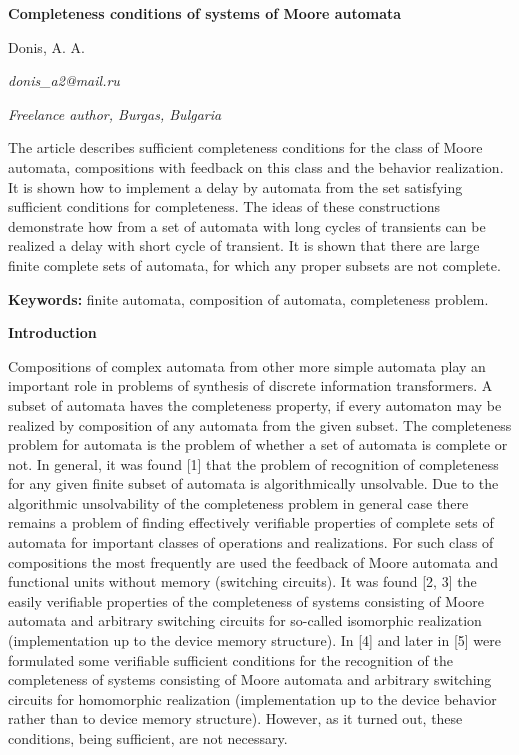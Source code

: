 \documentclass{article}
\begin{document}

\textbf{Completeness conditions of systems of Moore automata}

Donis, A. A.\textbf{\textit{}}

\textit{donis\_a2@mail.ru}

\textit{Freelance author, Burgas, Bulgaria}

The article describes sufficient completeness conditions for the class of Moore automata, compositions with feedback on this class and the behavior realization. It is shown how to implement a delay by automata from the set satisfying sufficient conditions for completeness. The ideas of these constructions demonstrate how from a set of automata with long cycles of transients can be realized a delay with short cycle of transient. It is shown that there are large finite complete sets of automata, for which any proper subsets are not complete.

\textbf{Keywords:} finite automata, composition of automata, completeness problem.

\textbf{Introduction}

Compositions of complex automata from other more simple automata play an important role in problems of synthesis of discrete information transformers. A subset of automata haves the completeness property, if every automaton may be realized by composition of any automata from the given subset. The completeness problem for automata is the problem of whether a set of automata is complete or not. In general, it was found [1] that the problem of recognition of completeness for any given finite subset of automata is algorithmically unsolvable. Due to the algorithmic unsolvability of the completeness problem in general case there remains a problem of finding effectively verifiable properties of complete sets of automata for important classes of operations and realizations. For such class of compositions the most frequently are used the feedback of Moore automata and functional units without memory (switching circuits). It was found [2, 3] the easily verifiable properties of the completeness of systems consisting of Moore automata and arbitrary switching circuits for so-called isomorphic realization (implementation up to the device memory structure). In [4] and later in [5] were formulated some verifiable sufficient conditions for the recognition of the completeness of systems consisting of Moore automata and arbitrary switching circuits for homomorphic realization (implementation up to the device behavior rather than to device memory structure). However, as it turned out, these conditions, being sufficient, are not necessary.
\end{document}
